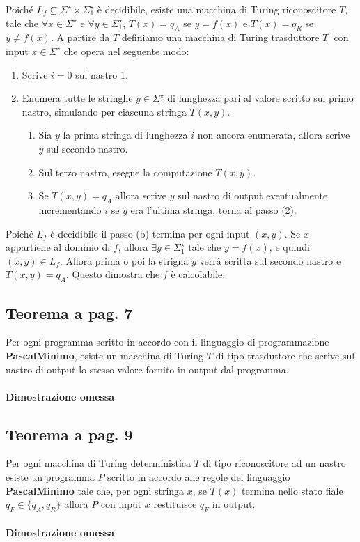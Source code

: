 Poiché $L_{f}\subseteq\Sigma^{\star} \times \Sigma^{\star}_{1}$ è decidibile, esiste una macchina di Turing riconoscitore $T$, tale che $\forall x\in \Sigma^{\star}$ e $\forall y\in \Sigma^{\star}_{1}$,
$T(x) = q_{A}$ se $y = f(x)$ e $T(x) = q_{R}$ se $y \neq f(x)$. A partire da $T$ definiamo una macchina di Turing trasduttore $T^{'}$ con input $x\in \Sigma^{\star}$ che opera nel seguente modo:
\begin{enumerate}
    \item Scrive $i = 0$ sul nastro 1.
    \item {
        Enumera tutte le stringhe $y\in \Sigma^{\star}_{1}$ di lunghezza pari al valore scritto sul primo nastro, simulando per ciascuna stringa $T(x, y)$.
        \begin{enumerate}
            \item Sia $y$ la prima stringa di lunghezza $i$ non ancora enumerata, allora scrive $y$ sul secondo nastro.
            \item Sul terzo nastro, esegue la computazione $T(x, y)$.
            \item Se $T(x, y) = q_{A}$ allora scrive $y$ sul nastro di output eventualmente incrementando $i$ se $y$ era l'ultima stringa, torna al passo (2). 
        \end{enumerate}
        }
\end{enumerate}

Poiché $L_{f}$ è decidibile il passo (b) termina per ogni input $(x, y)$. Se $x$ appartiene al dominio di $f$, allora $\exists y\in \Sigma^{\star}_{1}$ tale che $y = f(x)$, e quindi $(x, y)\in L_{f}$. Allora prima o poi la strigna $y$ verrà scritta sul secondo nastro
e $T(x, y) = q_{A}$. Questo dimostra che $f$ è calcolabile.

\subsection{Teorema a pag. 7}

Per ogni programma scritto in accordo con il linguaggio di programmazione \textbf{PascalMinimo}, esiste un macchina di Turing $T$ di tipo trasduttore che scrive sul nastro di output lo stesso valore fornito in output dal programma.

\paragraph*{Dimostrazione omessa}

\subsection{Teorema a pag. 9}

Per ogni macchina di Turing deterministica $T$ di tipo riconoscitore ad un nastro esiste un programma $P$ scritto in accordo alle regole
del linguaggio \textbf{PascalMinimo} tale che, per ogni stringa $x$, se $T(x)$ termina nello stato fiale $q_{F}\in\{q_{A}, q_{R}\}$ allora $P$ con input 
$x$ restituisce $q_{F}$ in output.

\paragraph*{Dimostrazione omessa}